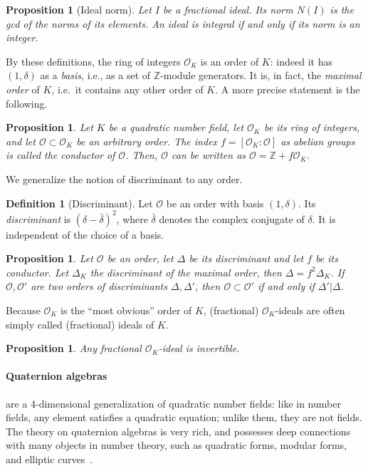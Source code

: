 \documentclass[10pt]{article}
\theoremstyle{plain}
\newtheorem{proposition}[theorem]{Proposition}
\theoremstyle{definition}
\newtheorem{definition}[theorem]{Definition}
\def\O{\ensuremath{\mathcal{O}}}
\begin{document}
\begin{proposition}[Ideal norm]
  Let $I$ be a fractional ideal. %
  Its \emph{norm} $N(I)$ is the gcd of the norms of its elements. %
  An ideal is integral if and only if its norm is an integer.
\end{proposition}

By these definitions, the ring of integers $\O_K$ is an order of $K$:
indeed it has $(1,δ)$ as a \emph{basis}, i.e., as a set of $ℤ$-module
generators. %
It is, in fact, the \emph{maximal order} of $K$, i.e.\ it contains
any other order of $K$. %
A more precise statement is the following.

\begin{proposition}
  Let $K$ be a quadratic number field, let $\O_K$ be its ring of
  integers, and let $\O ⊂ \O_K$ be an arbitrary order. %
  The index $f=[\O_K:\O]$ as abelian groups is called the
  \emph{conductor of $\O$}. %
  Then, $\O$ can be written as $\O=ℤ+f\O_K$. %
\end{proposition}  

We generalize the notion of discriminant to any order.

\begin{definition}[Discriminant]
  Let $\O$ be an order with basis $(1,δ)$. %
  Its \emph{discriminant} is $(δ-\bar{δ})^2$, where
  $\bar{δ}$ denotes the complex conjugate of $δ$. %
  It is independent of the choice of a basis.
\end{definition}

\begin{proposition}
  Let $\O$ be an order, let $Δ$ be its discriminant and let $f$ be its
  conductor. %
  Let $Δ_K$ the discriminant of the maximal order, then
  $Δ = f^2Δ_K$. %
  If $\O,\O'$ are two orders of discriminants $Δ,Δ'$, then $\O⊂\O'$ if
  and only if $Δ'|Δ$.
\end{proposition}

Because $\O_K$ is the ``most obvious'' order of $K$, (fractional)
$\O_K$-ideals are often simply called (fractional) ideals of $K$. %

\begin{proposition}
  Any fractional $\O_K$-ideal is invertible.
\end{proposition}


\paragraph{Quaternion algebras} %
are a 4-dimensional generalization of quadratic number fields: like in
number fields, any element satisfies a quadratic equation; unlike
them, they are not fields. The theory on quaternion algebras is very rich,
and possesses deep connections with many objects in number theory, such as
quadratic forms, modular forms, and elliptic curves~\cite{Lam,Voight2018}.
\end{document}
